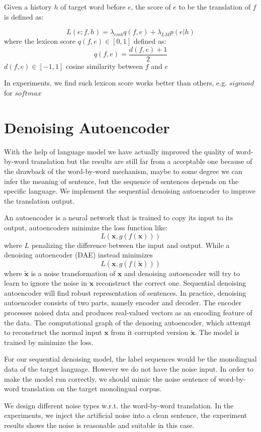 	Given a history ${h}$ of target word before ${e}$, the score of $e$ to be the translation of ${f}$ is defined as:
	
	\[ L(e; f, h) = \lambda_{emb} {q(f,e)} + \lambda_{LM} {p(e|h)} \]
 	where the lexicon score ${q(f,e) \in [0,1]}$ defined as:
 	\[q(f,e) = \frac{d(f,e)+1}{2} \]
 	${d(f,e)\in [-1,1]}$ cosine similarity between ${f}$ and ${e}$
	
	
	In experiments, we find such lexicon score works better than others, e.g. ${sigmoid}$ for ${softmax}$
	
\section{Denoising Autoencoder}

	With the help of language model we have actually improved the quality of word-by-word translation but the results are still far from a acceptable one because of the drawback of the word-by-word mechanism, maybe to some degree we can infer the meaning of sentence, but the sequence of sentences depends on the specific language. We implement the sequential denoising autoencoder to improve the translation output.
	
	An autoencoder is a neural network that is trained to copy its input to its output, autoencoders minimize the loss function like: 
	\[ L(\bm x, g(f(\bm x))) \]
	where ${L}$ penalizing the difference between the input and output.
	While a denoising autoencoder (DAE) instead minimizes
	\[ L(\bm x, g(f( \bm {\tilde  x})))\]
	where ${\bm{\tilde{x}}}$ is a noise transformation of ${\bm x}$ and denoising autoencoder will try to learn to ignore the noise in ${\bm x}$ reconstruct the correct one. Sequential denoising autoencoder will find robust representation of sentences.
	In practice,  denoising autoencoder consists of two parts, namely encoder and decoder. The encoder processes noised data and produces real-valued vectors as an encoding feature of the data. The computational graph of the denosing autoencoder, which attempt to reconstruct the normal input ${\bm x}$ from it corrupted version ${\bm{\tilde{x}}}$. The model is trained by minimize the loss.
	
	For our sequential denoising model, the label sequences would be the monolingual data of the target language. However we do not have the noise input. In order to make the model run correctly, we should mimic the noise sentence of word-by-word translation on the target monolingual corpus.
	
	We design different noise types w.r.t. the word-by-word translation. In the experiments, we inject the artificial noise into a clean sentence, the experiment results shows the noise is reasonable and suitable in this case.
	
